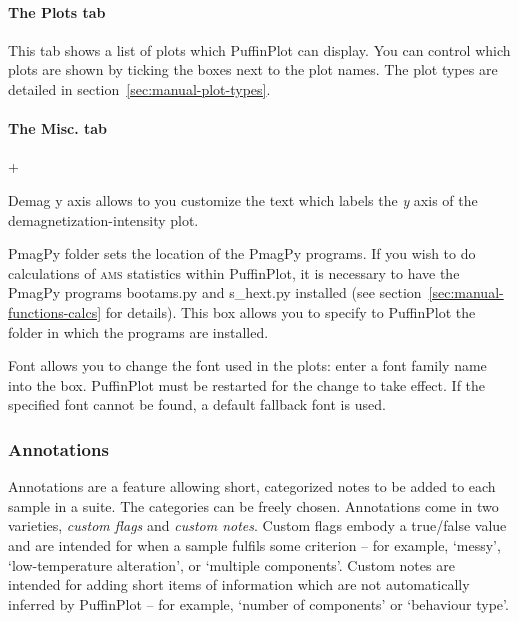 \documentclass[a4paper]{article}
\newcommand{\menuitemlabel}[1]{%
\mbox{\textsf{#1}}\hfil}
\newenvironment{menuitemlist}%
{\begin{list}{}{%
\renewcommand{\makelabel}{\menuitemlabel}%
\setlength{\labelwidth}{35pt}%
\setlength{\leftmargin}%
             {\labelwidth+\labelsep}}}%
{\end{list}}
\newcommand{\ppcmd}[1]{\textsf{#1}} %
\newcommand{\caps}[1]{\textsc{#1}} %
\newcommand{\quot}[1]{`#1'}
\begin{document}
\paragraph{The \ppcmd{Plots} tab}

This tab shows a list of plots which PuffinPlot can display. You can control
which plots are shown by ticking the boxes next to the plot names. The plot
types are detailed in section~\ref{sec:manual-plot-types}.

\paragraph{The \ppcmd{Misc.} tab}

\begin{menuitemlist}

\item[Demag y axis] allows to you customize the text which labels the {\em y}
  axis of the demagnetization-intensity plot.

\item[PmagPy folder] sets the location of the PmagPy programs. If you wish to
  do calculations of \caps{ams} statistics within PuffinPlot, it is necessary
  to have the PmagPy programs \ppcmd{bootams.py} and \ppcmd{s\_hext.py}
  installed (see section~\ref{sec:manual-functions-calcs} for details). This
  box allows you to specify to PuffinPlot the folder in which the programs
  are installed.

\item[Font] allows you to change the font used in the plots: enter a font
  family name into the box. PuffinPlot must be restarted for the change to
  take effect. If the specified font cannot be found, a default fallback font
  is used.

\end{menuitemlist}

\subsubsection{\label{sec:manual-annotations}Annotations}

Annotations are a feature allowing short, categorized notes to be added to
each sample in a suite. The categories can be freely chosen. Annotations come
in two varieties, {\em custom flags} and {\em custom notes}. Custom flags
embody a true/false value and are intended for when a sample fulfils some
criterion -- for example, \quot{messy}, \quot{low-temperature alteration},
or \quot{multiple components}. Custom notes are intended for adding short
items of information which are not automatically inferred by PuffinPlot --
for example, \quot{number of components} or \quot{behaviour type}.
\end{document}

